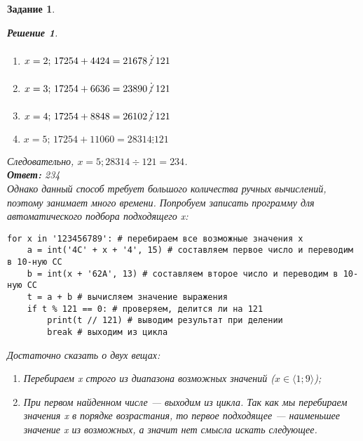 \documentclass[12pt]{article}
\theoremstyle{problem_style}
\newtheorem{problem}{Задание}[subsection]
\newtheorem{solution}{Решение}[subsection]
\begin{document}
\begin{problem}
\begin{solution}
\begin{enumerate}
    \item $x = 2;\, 17254 + 4424 = 21678 \centernot\vdots 121$
    \item $x = 3;\, 17254 + 6636 = 23890 \centernot\vdots 121$
    \item $x = 4;\, 17254 + 8848 = 26102 \centernot\vdots 121$
    \item $x = 5;\, 17254 + 11060 = 28314 \vdots 121$
\end{enumerate}
Следовательно, $x = 5; 28314 \div 121 = 234$.\\
\textbf{Ответ:} 234\\
Однако данный способ требует большого количества ручных вычислений, поэтому занимает много времени. Попробуем записать программу для автоматического подбора подходящего x:
\begin{verbatim}
for x in '123456789': # перебираем все возможные значения x
    a = int('4C' + x + '4', 15) # составляем первое число и переводим в 10-ную СС
    b = int(x + '62A', 13) # составляем второе число и переводим в 10-ную СС
    t = a + b # вычисляем значение выражения
    if t % 121 == 0: # проверяем, делится ли на 121
        print(t // 121) # выводим результат при делении
        break # выходим из цикла
\end{verbatim}
Достаточно сказать о двух вещах:
\begin{enumerate}
    \item Перебираем x строго из диапазона возможных значений ($x \in \langle 1; 9 \rangle $);
    \item При первом найденном числе — выходим из цикла. Так как мы перебираем значения x в порядке возрастания, то первое подходящее — наименьшее значение x из возможных, а значит нет смысла искать следующее.
\end{enumerate}
\end{solution}
\end{problem}
\end{document}
